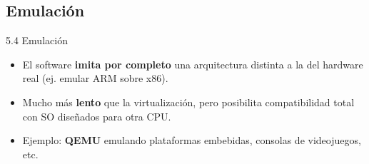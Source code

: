 \documentclass{beamer}
\begin{document}
\subsection{Emulación}
\begin{frame}{5.4 Emulación}
	\begin{itemize}
		\item El software \textbf{imita por completo} una arquitectura distinta a la del hardware real (ej. emular ARM sobre x86).
		\item Mucho más \textbf{lento} que la virtualización, pero posibilita compatibilidad total con SO diseñados para otra CPU.
		\item Ejemplo: \textbf{QEMU} emulando plataformas embebidas, consolas de videojuegos, etc.
	\end{itemize}
\end{frame}
\end{document}

